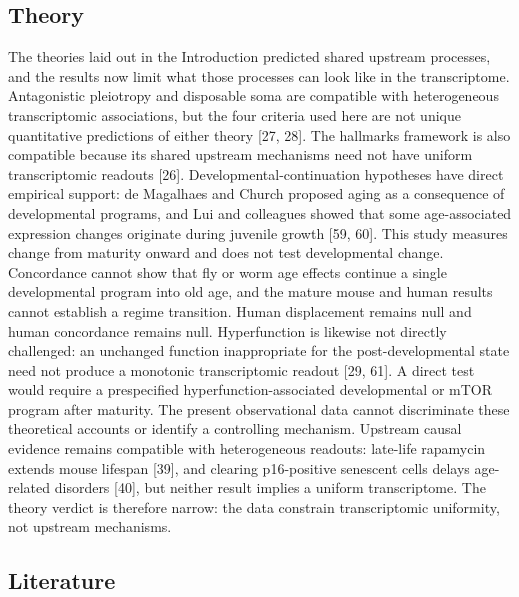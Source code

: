 \documentclass[11pt]{article}
\begin{document}
\subsection*{Theory}

The theories laid out in the Introduction predicted shared upstream processes, and the results now limit what those processes can look like in the transcriptome. Antagonistic pleiotropy and disposable soma are compatible with heterogeneous transcriptomic associations, but the four criteria used here are not unique quantitative predictions of either theory [27, 28]. The hallmarks framework is also compatible because its shared upstream mechanisms need not have uniform transcriptomic readouts [26]. Developmental-continuation hypotheses have direct empirical support: de Magalhaes and Church proposed aging as a consequence of developmental programs, and Lui and colleagues showed that some age-associated expression changes originate during juvenile growth [59, 60]. This study measures change from maturity onward and does not test developmental change. Concordance cannot show that fly or worm age effects continue a single developmental program into old age, and the mature mouse and human results cannot establish a regime transition. Human displacement remains null and human concordance remains null. Hyperfunction is likewise not directly challenged: an unchanged function inappropriate for the post-developmental state need not produce a monotonic transcriptomic readout [29, 61]. A direct test would require a prespecified hyperfunction-associated developmental or mTOR program after maturity. The present observational data cannot discriminate these theoretical accounts or identify a controlling mechanism. Upstream causal evidence remains compatible with heterogeneous readouts: late-life rapamycin extends mouse lifespan [39], and clearing p16-positive senescent cells delays age-related disorders [40], but neither result implies a uniform transcriptome. The theory verdict is therefore narrow: the data constrain transcriptomic uniformity, not upstream mechanisms.

\subsection*{Literature}
\end{document}
